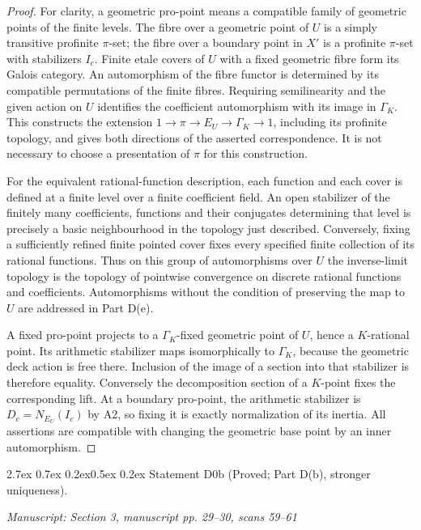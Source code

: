 \documentclass[11pt,a4paper]{article}
\makeatletter
\newcommand{\passage}[1]{\par\smallskip\noindent\textit{Manuscript: #1}\par\smallskip}
\renewcommand\paragraph{\@startsection{paragraph}{4}{\z@}%
  {2.7ex \@plus 0.7ex \@minus 0.2ex}{0.5ex \@plus 0.2ex}%
  {\normalfont\normalsize\bfseries}}
\makeatother
\begin{document}
\begin{proof}
For clarity, a geometric pro-point means a compatible family of geometric points of the finite levels. The fibre over a geometric point of $U$ is a simply transitive profinite $\pi$-set; the fibre over a boundary point in $X'$ is a profinite $\pi$-set with stabilizers $I_c$. Finite etale covers of $U$ with a fixed geometric fibre form its Galois category. An automorphism of the fibre functor is determined by its compatible permutations of the finite fibres. Requiring semilinearity and the given action on $U$ identifies the coefficient automorphism with its image in $\Gamma_K$. This constructs the extension $1\to\pi\to E_U\to\Gamma_K\to1$, including its profinite topology, and gives both directions of the asserted correspondence. It is not necessary to choose a presentation of $\pi$ for this construction.

For the equivalent rational-function description, each function and each cover is defined at a finite level over a finite coefficient field. An open stabilizer of the finitely many coefficients, functions and their conjugates determining that level is precisely a basic neighbourhood in the topology just described. Conversely, fixing a sufficiently refined finite pointed cover fixes every specified finite collection of its rational functions. Thus on this group of automorphisms over $U$ the inverse-limit topology is the topology of pointwise convergence on discrete rational functions and coefficients. Automorphisms without the condition of preserving the map to $U$ are addressed in Part D(e).

A fixed pro-point projects to a $\Gamma_K$-fixed geometric point of $U$, hence a $K$-rational point. Its arithmetic stabilizer maps isomorphically to $\Gamma_K$, because the geometric deck action is free there. Inclusion of the image of a section into that stabilizer is therefore equality. Conversely the decomposition section of a $K$-point fixes the corresponding lift. At a boundary pro-point, the arithmetic stabilizer is $D_c=N_{E_U}(I_c)$ by A2, so fixing it is exactly normalization of its inertia. All assertions are compatible with changing the geometric base point by an inner automorphism.
\end{proof}

\paragraph{Statement D0b (Proved; Part D(b), stronger uniqueness).}\label{res:D0b}
\passage{Section 3, manuscript pp. 29–30, scans 59–61}
\end{document}
